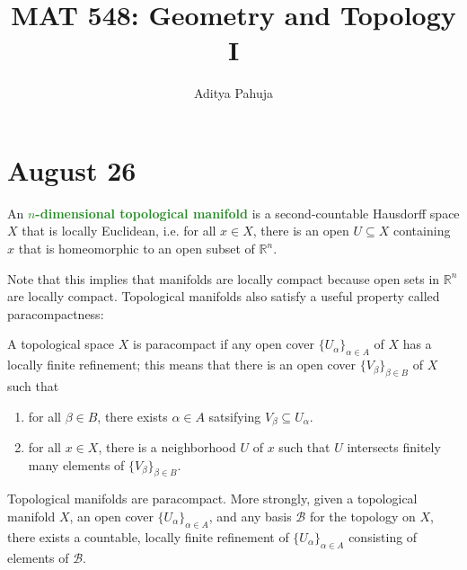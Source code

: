 \documentclass[11pt]{scrartcl}
\title{\vspace{-2em}MAT 548: Geometry and Topology I}
\author{\large Aditya Pahuja}
\date{}
\providecommand{\RR}{\mathbb R}
\providecommand{\ii}{\item}
\providecommand{\vocab}[1]{{\textbf{\textcolor{ForestGreen}{#1}}}}
\begin{document}
\maketitle
\tableofcontents

\pagebreak

\section{August 26}\label{sec:aug26}

\begin{definition}
    \label{def:topman}
    An \vocab{$n$-dimensional topological manifold}
    is a second-countable Hausdorff space $X$ that is locally Euclidean,
    i.e. for all $x\in X$, there is an open $U\subseteq X$ containing $x$
    that is homeomorphic to an open subset of $\RR^n$.
\end{definition}

Note that this implies that manifolds are locally compact
because open sets in $\RR^n$ are locally compact.
Topological manifolds also satisfy a useful property called paracompactness:
\begin{definition}[Paracompactness]
    \label{def:paracompact}
    A topological space $X$ is paracompact if
    any open cover $\{U_\alpha\}_{\alpha\in A}$ of $X$
    has a locally finite refinement;
    this means that there is an open cover $\{V_\beta\}_{\beta\in B}$ of $X$
    such that
    \begin{enumerate}[(1)]
        \ii for all $\beta\in B$, there exists $\alpha\in A$ satsifying
	$V_\beta\subseteq U_\alpha$.
	\ii for all $x\in X$, there is a neighborhood $U$ of $x$
	such that $U$ intersects finitely many elements of $\{V_\beta\}_{\beta\in B}$.
    \end{enumerate}
\end{definition}

\begin{prop}
    \label{prop:topman-paracompact}
    Topological manifolds are paracompact.
    More strongly, given a topological manifold $X$,
    an open cover $\{U_\alpha\}_{\alpha\in A}$, and
    any basis $\mathcal B$ for the topology on $X$,
    there exists a countable, locally finite
    refinement of $\{U_\alpha\}_{\alpha\in A}$
    consisting of elements of $\mathcal B$.
\end{prop}
\end{document}
